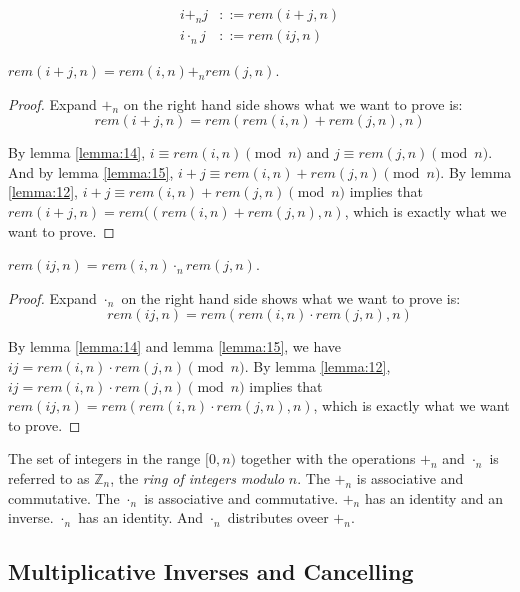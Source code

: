 \documentclass[11pt]{article}
\begin{document}
\begin{definition}
\begin{align*}
i +_n j &::= rem(i+j, n) \\
i \cdot_n j &::= rem(ij, n)
\end{align*}
\end{definition}

\begin{lemma} \label{lemma:17}
$rem(i+j,n) = rem(i,n) +_n rem(j,n)$.
\end{lemma}


\begin{proof}
Expand $+_n$ on the right hand side shows what we want to prove is:
\[
  rem(i+j,n) = rem(rem(i,n)+rem(j,n),n)
\]

By lemma \ref{lemma:14}, $i \equiv rem(i,n) \pmod{n}$ and $j \equiv rem(j,n) \pmod{n}$. And
by lemma \ref{lemma:15}, $i+j \equiv rem(i,n)+rem(j,n) \pmod{n}$. By lemma \ref{lemma:12},
$i+j \equiv rem(i,n) + rem(j,n) \pmod{n}$ implies that
$rem(i+j,n) = rem((rem(i,n) + rem(j,n), n)$, which is exactly what we want to prove.
\end{proof}

\begin{lemma} \label{lemma:18}
$rem(ij,n) = rem(i,n) \cdot_n rem(j,n)$.
\end{lemma}

\begin{proof}
Expand $\cdot_n$ on the right hand side shows what we want to prove is:
\[
  rem(ij,n) = rem(rem(i,n) \cdot rem(j,n),n)
\]

By lemma \ref{lemma:14} and lemma \ref{lemma:15}, we have
$ij = rem(i,n) \cdot rem(j,n) \pmod{n}$. By lemma \ref{lemma:12},
$ij = rem(i,n) \cdot rem(j,n) \pmod{n}$ implies that
$rem(ij,n) = rem(rem(i,n) \cdot rem(j,n), n)$, which is exactly what we want to prove.
\end{proof}

The set of integers in the range $[0, n)$ together with the operations $+_n$ and $\cdot_n$
is referred to as $\mathbb{Z}_n$, the \emph{ring of integers modulo} $n$. The $+_n$ is
associative and commutative. The $\cdot_n$ is associative and commutative. $+_n$ has an
identity and an inverse. $\cdot_n$ has an identity. And $\cdot_n$ distributes oveer $+_n$.

\subsection{Multiplicative Inverses and Cancelling}
\end{document}
